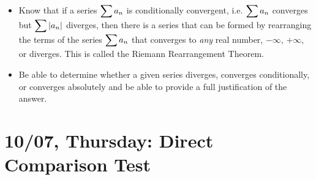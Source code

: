 \documentclass[11pt,letterpaper]{article}
\begin{document}
\begin{itemize}
\item Know that if a series $\displaystyle\sum a_n$ is conditionally convergent, i.e. $\displaystyle\sum a_n$ converges but $\displaystyle\sum |a_n|$ diverges, then there is a series that can be formed by rearranging the terms of the series $\displaystyle\sum a_n$ that converges to \textit{any} real number, $-\infty$, $+\infty$, or diverges. This is called the Riemann Rearrangement Theorem.

\item Be able to determine whether a given series diverges, converges conditionally, or converges absolutely and be able to provide a full justification of the answer. 
\end{itemize}

\newpage
\section*{10/07, Thursday: Direct Comparison Test\label{10-07}}
\end{document}
